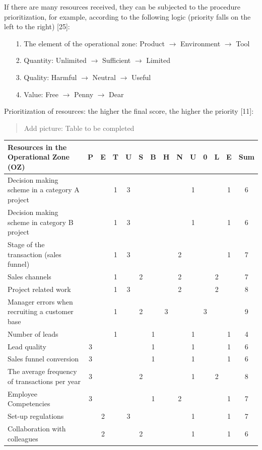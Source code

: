 \documentclass[11pt,a4paper]{book}
\newcommand{\addpicture}[1]{
  \begin{quote} Add picture: #1\end{quote}
}
\begin{document}
If there are many resources received, they can be subjected to the procedure
prioritization, for example, according to the following logic (priority falls
on the left to the right) [25]:
\begin{itemize}
\item[1.] The element of the operational zone: Product $\to$ Environment $\to$
  Tool
\item[2.] Quantity: Unlimited $\to$ Sufficient $\to$ Limited
\item[3.] Quality: Harmful $\to$ Neutral $\to$ Useful
\item[4.] Value: Free $\to$ Penny $\to$ Dear
\end{itemize}

Prioritization of resources: the higher the final score, the higher the
priority [11]:

\addpicture{Table to be completed}

\begin{center}
  \begin{tabular}{|p{5cm}|*{3}{c|}|*{3}{c|}|*{3}{c|}|*{3}{c|}|c|}\hline
    \textbf{Resources in the Operational Zone (OZ)}
    &P&E&T&U&S&B&H&N&U&0&L&E&Sum\\\hline
 Decision making scheme in a category A project&&&1&3&&&&&1&&&1&6\\
 Decision making scheme in category B project  &&&1&3&&&&&1&&&1&6\\
 Stage of the transaction (sales funnel)       &&&1&3&&&&2&&&&1&7\\
 Sales channels                                &&&1&&2&&&2&&&2&&7\\
 Project related work                          &&&1&3&&&&2&&&2&&8\\
 Manager errors when recruiting a customer base&&&1&&2&&3&&&3&&&9\\
 Number of leads                               &&&1&&&1&&&1&&&1&4\\
 Lead quality                                  &3&&&&&1&&&1&&&1&6\\
 Sales funnel conversion                       &3&&&&&1&&&1&&&1&6\\
 The average frequency of transactions per year&3&&&&2&&&&1&&2&&8\\
 Employee Competencies                         &3&&&&&1&&2&&&&1&7\\
 Set-up regulations                            &&2&&3&&&&&1&&&1&7\\
 Collaboration with colleagues                 &&2&&&2&&&&1&&&1&6\\\hline
  \end{tabular}
\end{center}
\end{document}
